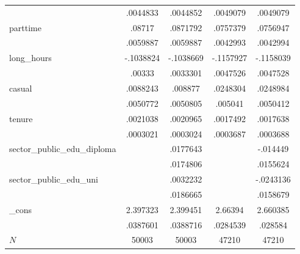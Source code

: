 {\begin{tabular}{l*{4}{c}}
            &    .0044833&    .0044852&    .0049079&    .0049079\\
parttime    &      .08717&    .0871792&    .0757379&    .0756947\\
            &    .0059887&    .0059887&    .0042993&    .0042994\\
long\_hours  &   -.1038824&   -.1038669&   -.1157927&   -.1158039\\
            &      .00333&    .0033301&    .0047526&    .0047528\\
casual      &    .0088243&     .008877&    .0248304&    .0248984\\
            &    .0050772&    .0050805&     .005041&    .0050412\\
tenure      &    .0021038&    .0020965&    .0017492&    .0017638\\
            &    .0003021&    .0003024&    .0003687&    .0003688\\
sector\_public\_edu\_diploma&            &    .0177643&            &    -.014449\\
            &            &    .0174806&            &    .0155624\\
sector\_public\_edu\_uni&            &    .0032232&            &   -.0243136\\
            &            &    .0186665&            &    .0158679\\
\_cons      &    2.397323&    2.399451&     2.66394&    2.660385\\
            &    .0387601&    .0388716&    .0284539&     .028584\\
\hline
\(N\)       &       50003&       50003&       47210&       47210\\
\hline\hline
\end{tabular}
}
